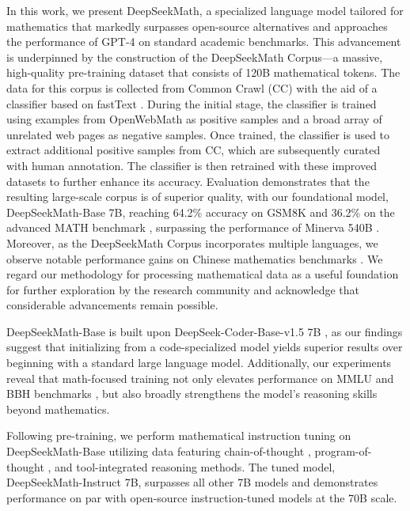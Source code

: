 In this work, we present DeepSeekMath, a specialized language model tailored for mathematics that markedly surpasses open-source alternatives and approaches the performance of GPT-4 on standard academic benchmarks. This advancement is underpinned by the construction of the DeepSeekMath Corpus—a massive, high-quality pre-training dataset that consists of 120B mathematical tokens. The data for this corpus is collected from Common Crawl (CC) with the aid of a classifier based on fastText \citep{joulin2016fasttext}. During the initial stage, the classifier is trained using examples from OpenWebMath \citep{openwebmath} as positive samples and a broad array of unrelated web pages as negative samples. Once trained, the classifier is used to extract additional positive samples from CC, which are subsequently curated with human annotation. The classifier is then retrained with these improved datasets to further enhance its accuracy. Evaluation demonstrates that the resulting large-scale corpus is of superior quality, with our foundational model, DeepSeekMath-Base 7B, reaching 64.2\% accuracy on GSM8K \citep{gsm8k} and 36.2\% on the advanced MATH benchmark \citep{MATH}, surpassing the performance of Minerva 540B \citep{minerva}. Moreover, as the DeepSeekMath Corpus incorporates multiple languages, we observe notable performance gains on Chinese mathematics benchmarks \citep{wei2023cmath,agieval}. We regard our methodology for processing mathematical data as a useful foundation for further exploration by the research community and acknowledge that considerable advancements remain possible.

DeepSeekMath-Base is built upon DeepSeek-Coder-Base-v1.5 7B \citep{deepseek-coder}, as our findings suggest that initializing from a code-specialized model yields superior results over beginning with a standard large language model. Additionally, our experiments reveal that math-focused training not only elevates performance on MMLU \citep{mmlu} and BBH benchmarks \citep{bbh}, but also broadly strengthens the model’s reasoning skills beyond mathematics.

Following pre-training, we perform mathematical instruction tuning on DeepSeekMath-Base utilizing data featuring chain-of-thought \citep{cot}, program-of-thought \citep{pot,pal}, and tool-integrated reasoning \citep{tora} methods. The tuned model, DeepSeekMath-Instruct 7B, surpasses all other 7B models and demonstrates performance on par with open-source instruction-tuned models at the 70B scale.

